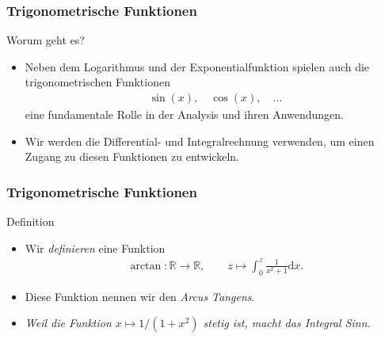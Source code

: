 \documentclass{beamer}
\title[Annuma]{\mytitle}
\author[Amin Coja-Oghlan]{Amin Coja-Oghlan}
\institute[Frankfurt]{JWGUFFM}
\date{}
\renewcommand{\emph}[1]{{\textcolor{solarizedRed}{\itshape #1}}}
\newcommand\dd{\mathrm d}
\newcommand\RR{\mathbb R}
\newcommand{\mytitle}{Trigonometrische Funktionen}
\begin{document}
\frame[plain]{\titlepage}

\begin{frame}\frametitle{\mytitle}
	\begin{block}{Worum geht es?}
		\begin{itemize}
			\item Neben dem Logarithmus und der Exponentialfunktion spielen auch die trigonometrischen Funktionen
				\begin{align*}
					\sin(x),\quad\cos(x),\quad\ldots
				\end{align*}
				eine fundamentale Rolle in der Analysis und ihren Anwendungen.
			\item Wir werden die Differential- und Integralrechnung verwenden, um einen Zugang zu diesen Funktionen zu entwickeln.
		\end{itemize}
	\end{block}
\end{frame}

\begin{frame}\frametitle{\mytitle}
	\begin{block}{Definition}
		\begin{itemize}
			\item Wir {\itshape definieren} eine Funktion
				\begin{align*}
				\arctan:\RR\to\RR,\qquad z\mapsto\int_0^z\frac{1}{x^2+1}\dd x.
				\end{align*}
			\item Diese Funktion nennen wir den \emph{Arcus Tangens}.
			\item \itshape Weil die Funktion $x\mapsto1/(1+x^2)$ stetig ist, macht das Integral Sinn.
		\end{itemize}
	\end{block}
\end{frame}
\end{document}
